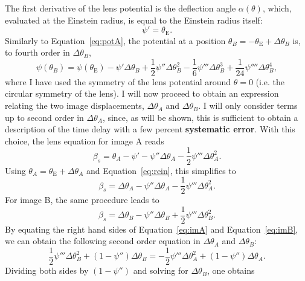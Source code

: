 \documentclass[usenatbib]{mnras}
\def\psii{\psi'}
\def\psiii{\psi''}
\def\psiiii{\psi'''}
\def\psiiv{\psi''''}
\def\tein{\theta_{\mathrm{E}}}
\def\Eref#1{Equation~\ref{#1}\xspace}
\begin{document}
The first derivative of the lens potential is the deflection angle $\alpha(\theta)$, which, evaluated at the Einstein radius, is equal to the Einstein radius itself:
\begin{equation}\label{eq:rein}
\psii = \tein.
\end{equation}
Similarly to \Eref{eq:potA}, the potential at a position $\theta_B = -\tein + \Delta\theta_B$ is, to fourth order in $\Delta\theta_B$,
\begin{equation}\label{eq:potB}
\psi(\theta_B) = \psi(\tein) - \psii \Delta\theta_B + \frac12 \psiii \Delta\theta_B^2 - \frac16 \psiiii \Delta\theta_B ^ 3 + \frac{1}{24}\psiiv\Delta\theta_B^4,
\end{equation}
where I have used the symmetry of the lens potential around $\theta = 0$ (i.e. the circular symmetry of the lens).
I will now proceed to obtain an expression relating the two image displacements, $\Delta\theta_A$ and $\Delta\theta_B$.
I will only consider terms up to second order in $\Delta\theta_A$, since, as will be shown, this is sufficient to obtain a description of the time delay with a few percent {\bf systematic error}.
With this choice, the lens equation for image A reads
\begin{equation}
\beta_s = \theta_A - \psii - \psiii \Delta\theta_A - \frac12 \psiiii \Delta\theta_A^2.
\end{equation}
Using $\theta_A = \tein + \Delta\theta_A$ and \Eref{eq:rein}, this simplifies to
\begin{equation}\label{eq:imA}
\beta_s = \Delta\theta_A - \psiii \Delta\theta_A - \frac12 \psiiii \Delta\theta_A^2.
\end{equation}
For image B, the same procedure leads to
\begin{equation}\label{eq:imB}
\beta_s = \Delta\theta_B - \psiii \Delta\theta_B + \frac12 \psiiii \Delta\theta_B^2.
\end{equation}
By equating the right hand sides of \Eref{eq:imA} and \Eref{eq:imB}, we can obtain the following second order equation in $\Delta\theta_A$ and $\Delta\theta_B$:
\begin{equation}
\frac12\psiiii\Delta\theta_B^2 + (1-\psiii)\Delta\theta_B = -\frac12\psiiii\Delta\theta_A^2 + (1-\psiii)\Delta\theta_A.
\end{equation}
Dividing both sides by $(1-\psiii)$ and solving for $\Delta\theta_B$, one obtains
\end{document}

